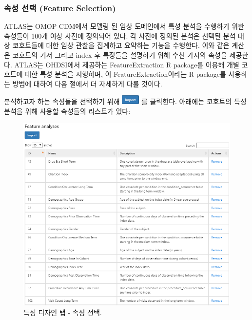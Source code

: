 \documentclass[11pt]{book}
\theoremstyle{definition}
\theoremstyle{definition}
\theoremstyle{definition}
\theoremstyle{remark}
\begin{document}
\subsubsection*{속성 선택 (Feature
Selection)}\label{--feature-selection}

ATLAS는 OMOP CDM에서 모델링 된 임상 도메인에서 특성 분석을 수행하기 위한
속성들이 100개 이상 사전에 정의되어 있다. 각 사전에 정의된 분석은 선택된
분석 대상 코호트들에 대한 임상 관찰을 집계하고 요약하는 기능을 수행한다.
이와 같은 계산은 코호트의 기저 그리고 index 후 특징들을 설명하기 위해
수천 가지의 속성을 제공한다. ATLAS는 OHDSI에서 제공하는
FeatureExtraction R package를 이용해 개별 코호트에 대한 특성 분석을
시행하며, 이 FeatureExtraction이라는 R package를 사용하는 방법에 대하여
다음 절에서 더 자세하게 다룰 것이다. 

분석하고자 하는 속성들을 선택하기 위해
\includegraphics{images/Characterization/atlasImportButton.png} 를
클릭한다. 아래에는 코호트의 특성 분석을 위해 사용할 속성들의 리스트가
있다:

\begin{figure}

{\centering \includegraphics[width=1\linewidth]{images/Characterization/atlasCharacterizationFeatureSelection} 

}

\caption{특성 디자인 탭 - 속성 선택.}\label{fig:atlasCharacterizationFeatureSelection}
\end{figure}
\end{document}
